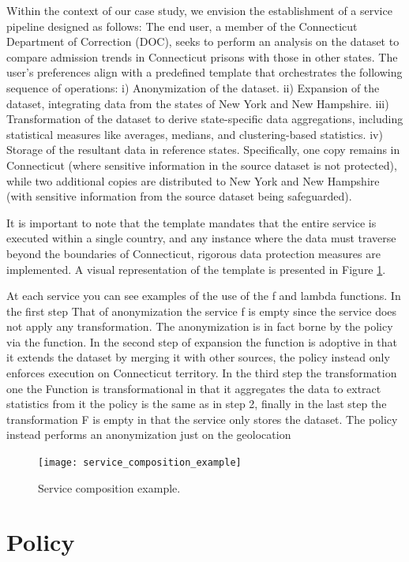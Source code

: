 Within the context of our case study, we envision the establishment of a service pipeline designed as follows:
The end user, a member of the Connecticut Department of Correction (DOC),
seeks to perform an analysis on the dataset to compare admission trends in Connecticut prisons with those in other states.
The user's preferences align with a predefined template that orchestrates the following sequence of operations:
i) Anonymization of the dataset.
ii) Expansion of the dataset, integrating data from the states of New York and New Hampshire.
iii) Transformation of the dataset to derive state-specific data aggregations, including statistical measures like averages, medians, and clustering-based statistics.
iv) Storage of the resultant data in reference states. Specifically, one copy remains in Connecticut (where sensitive information in the source dataset is not protected), while two additional copies are distributed to New York and New Hampshire (with sensitive information from the source dataset being safeguarded).

It is important to note that the template mandates that the entire service is executed within a single country, and any instance where the data must traverse beyond the boundaries of Connecticut, rigorous data protection measures are implemented.
A visual representation of the template is presented in Figure \ref{fig:service_composition_example}.

At each service you can see examples of the use of the f and lambda functions.
In the first step That of anonymization the service f is empty since the service does not apply any transformation.
The anonymization is in fact borne by the policy via the \myLambda function.
In the second step of expansion the function is adoptive in that it extends the dataset by merging it with other sources, the policy instead only enforces execution on Connecticut territory.
In the third step the transformation one the Function is transformational in that it aggregates the data to extract statistics from it the policy is the same as in step 2, finally in the last step the transformation F is empty in that the service only stores the dataset.
The policy instead performs an anonymization just on the geolocation


\begin{figure}
  \texttt{[image: service\_composition\_example]}
  \caption{Service composition example.}\label{fig:service_composition_example}

\end{figure}
\section{Policy}

